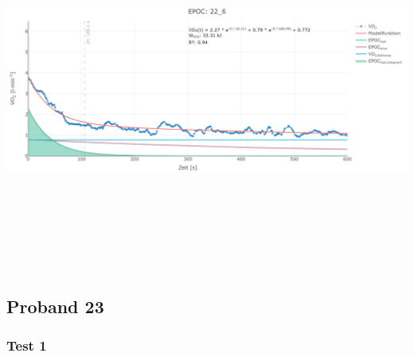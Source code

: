 \documentclass[
  letterpaper,
  DIV=11]{scrartcl}
\begin{document}
\includegraphics[width=11.45833in,height=4.6875in]{images/22_6.png}

\subsection{Proband 23}

\subsubsection{Test 1}
\end{document}
